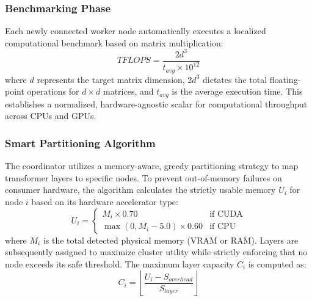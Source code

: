 \documentclass{ieeeaccess}
\begin{document}
\subsubsection{Benchmarking Phase}
Each newly connected worker node automatically executes a localized computational benchmark based on matrix multiplication:
\begin{equation}
TFLOPS = \frac{2d^3}{t_{avg} \times 10^{12}}
\end{equation}
where $d$ represents the target matrix dimension, $2d^3$ dictates the total floating-point operations for $d \times d$ matrices, and $t_{avg}$ is the average execution time. This establishes a normalized, hardware-agnostic scalar for computational throughput across CPUs and GPUs.

\subsubsection{Smart Partitioning Algorithm}
The coordinator utilizes a memory-aware, greedy partitioning strategy to map transformer layers to specific nodes. To prevent out-of-memory failures on consumer hardware, the algorithm calculates the strictly usable memory $U_i$ for node $i$ based on its hardware accelerator type:
\begin{equation}
U_i = \begin{cases}
M_i \times 0.70 & \text{if CUDA} \\
\max(0, M_i - 5.0) \times 0.60 & \text{if CPU}
\end{cases}
\end{equation}
where $M_i$ is the total detected physical memory (VRAM or RAM). Layers are subsequently assigned to maximize cluster utility while strictly enforcing that no node exceeds its safe threshold. The maximum layer capacity $C_i$ is computed as:
\begin{equation}
C_i = \left\lfloor \frac{U_i - S_{overhead}}{S_{layer}} \right\rfloor
\end{equation}
\end{document}
